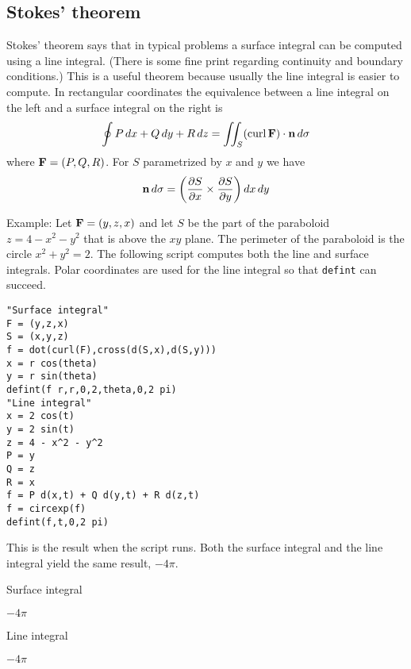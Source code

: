 \subsection{Stokes' theorem}

Stokes' theorem says that in typical problems a surface integral can be
computed using a line integral.
(There is some fine print regarding continuity and boundary conditions.)
This is a useful theorem because usually the line integral is easier to
compute.
In rectangular coordinates the equivalence between a line integral
on the left and a surface integral on the right is
%
$$\oint P\,dx+Q\,dy+R\,dz
=\int\!\!\!\int_S(\mathop{\rm curl}{\bf F})\cdot{\bf n}\,d\sigma
$$
%
where ${\bf F}=(P,Q,R)$.
For $S$ parametrized by $x$ and $y$ we have
$${\bf n}\,d\sigma=\left(
\frac{\partial S}{\partial x}\times\frac{\partial S}{\partial y}
\right)dx\,dy$$

\noindent
Example:
Let ${\bf F}=(y,z,x)$ and let $S$ be the part of the paraboloid
$z=4-x^2-y^2$
that is above the $xy$ plane.
The perimeter of the paraboloid is the circle $x^2+y^2=2$.
The following script computes both the line and surface integrals.
Polar coordinates are used for the line integral so that \verb$defint$ can succeed.

{\color{blue}
\begin{verbatim}
"Surface integral"
F = (y,z,x)
S = (x,y,z)
f = dot(curl(F),cross(d(S,x),d(S,y)))
x = r cos(theta)
y = r sin(theta)
defint(f r,r,0,2,theta,0,2 pi)
"Line integral"
x = 2 cos(t)
y = 2 sin(t)
z = 4 - x^2 - y^2
P = y
Q = z
R = x
f = P d(x,t) + Q d(y,t) + R d(z,t)
f = circexp(f)
defint(f,t,0,2 pi)
\end{verbatim}
}

\noindent
This is the result when the script runs.
Both the surface integral and the line integral
yield the same result, $-4\pi$.

\bigskip
\noindent
Surface integral

\noindent
$\displaystyle -4\pi$

\noindent
Line integral

\noindent
$\displaystyle -4\pi$
